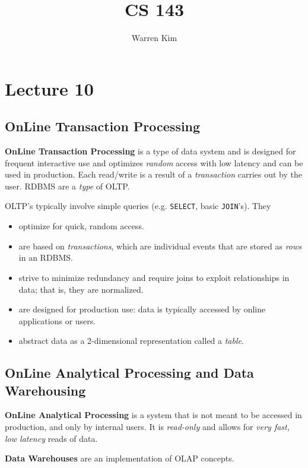 \documentclass{report}
\title{CS 143}
\author{Warren Kim}
\date{}
\newenvironment{definition}[1]{\begin{tcolorbox}[title={Definition: #1}]}{\end{tcolorbox}}
\renewcommand{\bf}[1]{\textbf{{#1}}}
\renewcommand{\tt}[1]{\texttt{{#1}}}
\renewcommand{\it}[1]{\textit{{#1}}}
\begin{document}
\maketitle

\tableofcontents
\newpage

\chapter{Lecture 10}
\section{OnLine Transaction Processing}
\begin{definition}{OnLine Transaction Processing (OLTP)}
    \bf{OnLine Transaction Processing} is a type of data system and is designed
    for frequent interactive use and optimizes \it{random} access with low
    latency and can be used in production. Each read/write is a result of a
    \it{transaction} carries out by the user. RDBMS are a \it{type} of OLTP.
\end{definition}

OLTP's typically involve simple queries (e.g. \tt{SELECT}, basic \tt{JOIN}'s).
They
\begin{itemize}[label=$\to$]
    \item optimize for quick, random access.
    \item are based on \it{transactions}, which are individual events that are
        stored as \it{rows} in an RDBMS.
    \item strive to minimize redundancy and require joins to exploit
        relationships in data; that is, they are normalized.
    \item are designed for production use: data is typically accessed by online
        applications or users.
    \item abstract data as a 2-dimensional representation called a \it{table}.
\end{itemize}


\section{OnLine Analytical Processing and Data Warehousing}
\begin{definition}{OnLine Analytical Processing/Data Warehousing (OLAP/DW)}
    \bf{OnLine Analytical Processing} is a system that is not meant to be
    accessed in production, and only by internal users. It is \it{read-only} and
    allows for \it{very fast, low latency} reads of data.
    \vspace{0.5em}

    \bf{Data Warehouses} are an implementation of OLAP concepts.
\end{definition}
\end{document}
